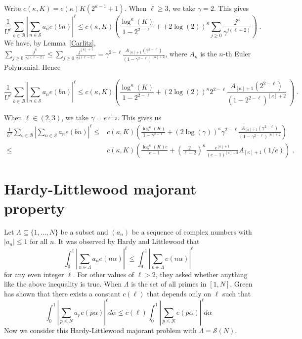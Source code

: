 \documentclass[12pt,article]{amsart}
\theoremstyle{remark}
\numberwithin{equation}{section}
\begin{document}
	\noindent
	Write $c(\kappa, K)=c(\kappa)K(2^{\kappa-1}+1)$. When $\ell\geq 3$, we take $\gamma=2$. This gives 
	\[
	\frac{1}{U^{\ell}}\sum_{b\in \mathcal{B}}\left|\sum_{n\in \mathcal{S}}a_n e(bn)\right|^{\ell}\leq  c(\kappa,K)\left(\frac{\log^\kappa(K)}{1-2^{2-\ell}}+(2\log(2))^\kappa\sum_{j\geq 0} \frac{j^\kappa}{\gamma^{j(\ell-2)}}\right)\; .
	\]
	We have, by Lemma~\ref{Carlitz}, $\sum_{j\geq 0} \frac{j^{\kappa}}{\gamma^{j(\ell-2)}}\leq \sum_{j\geq 0} \frac{j^{[\kappa]+1}}{\gamma^{j(\ell-2)}}=\gamma^{2-\ell} \frac{A_{[\kappa]+1}(\gamma^{2-\ell})}{(1-\gamma^{2-\ell})^{[\kappa]+2}}$, where $A_n$ is the $n$-th Euler Polynomial. Hence
	
	
	\begin{equation}
		\label{c_1}
		\frac{1}{U^{\ell}}\sum_{b\in \mathcal{B}}\left|\sum_{n\in \mathcal{S}}a_n e(bn)\right|^{\ell}\leq c(\kappa,K)\left(\frac{\log^\kappa(K)}{1-2^{2-\ell}}+(2\log(2))^\kappa 2^{2-\ell} \frac{A_{[\kappa]+1}(2^{2-\ell})}{(1-2^{2-\ell})^{[\kappa]+2}}\; \right)\; .
	\end{equation}
	
	
	
	When $\ell\in (2,3)$, we take $\gamma=e^{\frac{1}{\ell-2}}$. This gives us 
	\begin{align}
		\label{c_2}
		\frac{1}{U^{\ell}}\sum_{b\in \mathcal{B}}\left|\sum_{n\in \mathcal{S}}a_n e(bn)\right|^{\ell}\leq &c(\kappa, K)\left(\frac{\log^\kappa(K)}{1-\gamma^{2-\ell}}+(2\log(\gamma))^\kappa \gamma^{2-\ell} \frac{A_{[\kappa]+1}(\gamma^{2-\ell})}{(1-\gamma^{2-\ell})^{[\kappa]+2}}\right)\nonumber\\
		\leq & c(\kappa, K)\left(\frac{\log^\kappa(K)e}{e-1}+(\frac{2}{\ell-2})^\kappa\frac{e^{[\kappa]+1}}{(e-1)^{[\kappa]+2}}A_{[\kappa]+1}(1/e)\right)\; .
	\end{align}
	
	
	\section{Hardy-Littlewood majorant property}\label{HLMP}
	Let $\Lambda\subseteq\{1,\dots,N\}$ be a subset and $(a_n)$ be a sequence of complex numbers with $|a_n|\leq1$ for all $n.$ It was observed by Hardy and Littlewood that
	\[\int_0^1\left|\sum_{n\in\Lambda}a_ne(n\alpha)\right|^\ell\leq\int_0^1\left|\sum_{n\in\Lambda}e(n\alpha)\right|^\ell\]
	for any even integer $\ell$. For other values of $\ell>2$, they asked whether anything like the above inequality is true. When $\Lambda$ is the set of all primes in $[1,N]$, Green \cite{Green*03} has shown that there exists a constant $c(\ell)$ that depends only on $\ell$ such that 
	\[
	\int_{0}^1\left|\sum_{p\leq N}a_pe(p\alpha)\right|^\ell d\alpha\leq c(\ell) \int_{0}^1\left|\sum_{p\leq N}e(p\alpha)\right|^\ell d\alpha
	\]
	Now we consider this Hardy-Littlewood majorant problem with $\Lambda=\mathcal{S}(N)$.
	
\end{document}
